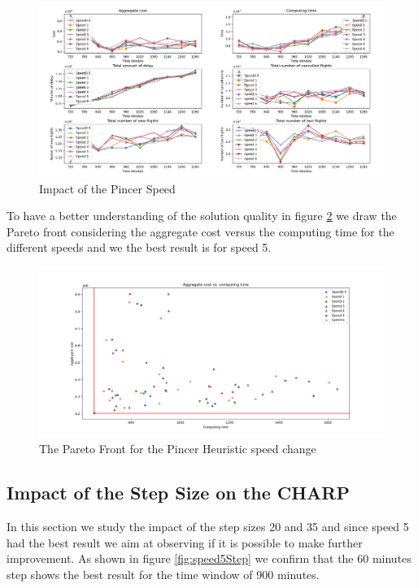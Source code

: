 	\begin{figure}[h!]
		\centering
		\includegraphics[width=\textwidth]{figures/speed.png}
		\caption[]{Impact of the Pincer Speed}
		\label{fig:speed}
	\end{figure}

To have a better understanding of the solution quality in figure \ref{fig:costTimeSpeed} we draw the Pareto front considering the aggregate cost versus the computing time for the different speeds and we the best result is for speed 5.

	\begin{figure}[h!]
		\centering
		\includegraphics[width=\textwidth]{figures/costTimeSpeed.png}
		\caption[]{The Pareto Front for the Pincer Heuristic speed change}
		\label{fig:costTimeSpeed}
	\end{figure}

\subsection{Impact of the Step Size on the CHARP} \label{sec:stepSize}

In this section we study the impact of the step sizes 20 and 35 and since speed 5 had the best result we aim at observing if it is possible to make further improvement. As shown in figure \ref{fig:speed5Step} we confirm that the 60 minutes step shows the best result for the time window of 900 minutes.

